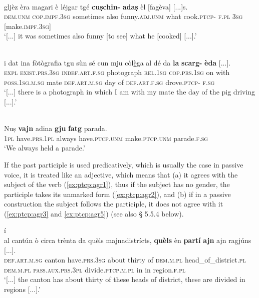 \ea\label{ex:ptcp3}
\\
\gll [...] gljèz èra magari è léjgar  tgé \textbf{cuṣchin-} \textbf{adaṣ} èl [fagèva] [...]s.\\
{} \textsc{dem.unm} \textsc{cop.impf.3sg} sometimes also funny.\textsc{adj.unm} what cook.\textsc{ptcp-} \textsc{f.pl} \textsc{3sg} [make.\textsc{impf.3sg}] \\
\glt `[...] it was sometimes also funny [to see] what he [cooked] [...].'
\z

\ea\label{ex:ptcp4}
\\	
\gll [...] i dat ina fòtògrafia tgu sùn sé cun mju còl\underline{è}ga al dé da \textbf{la} \textbf{scarg-} \textbf{èda} [...].\\
{} \textsc{expl} \textsc{exist.prs.3sg}  \textsc{indef.art.f.sg} photograph \textsc{rel.1sg}  \textsc{cop.prs.1sg} on with  \textsc{poss.1sg.m.sg} mate \textsc{def.art.m.sg} day of  \textsc{def.art.f.sg}  drove.\textsc{ptcp-} \textsc{f.sg}\\
\glt `[...] there is a photograph in which I am with my mate the day of the pig driving [...].'
\z

\ea
\label{ex:dcomp:3}
\\
\gll Nuṣ \textbf{vajn} adina \textbf{gju} \textbf{fatg} parada.   \\
\textsc{1pl} have.\textsc{prs.1pl} always have.\textsc{ptcp.unm} make.\textsc{ptcp.unm} parade.\textsc{f.sg}\\
\glt `We always held a parade.'
\z

If the past participle is used predicatively, which is usually the case in passive voice, it is treated like an adjective, which means that (a) it agrees with the subject of the verb (\ref{ex:ptcp:agr1}), thus if the subject has no gender, the participle  takes its unmarked form (\ref{ex:ptcp:agr2}), and (b) if in a passive construction the subject follows the participle, it does not agree with it (\ref{ex:ptcp:agr3} and \ref{ex:ptcp:agr5}) (see also § 5.5.4 below).

í
\ea\label{ex:ptcp:agr1}
\\
\gll [...] al cantún ò circa trènta da quèls majnadistrícts, \textbf{quèls} èn \textbf{partí} \textbf{ajn} ajn ragjúns [...].  \\
{} \textsc{def.art.m.sg} canton  have.\textsc{prs.3sg} about thirty of \textsc{dem.m.pl} head\_of\_district.\textsc{pl} \textsc{dem.m.pl} \textsc{pass.aux.prs.3pl} divide.\textsc{ptcp.m.pl} in in region.\textsc{f.pl}\\
\glt `[...] the canton has about thirty of these heads of district, these are divided in regions [...].'
\z

